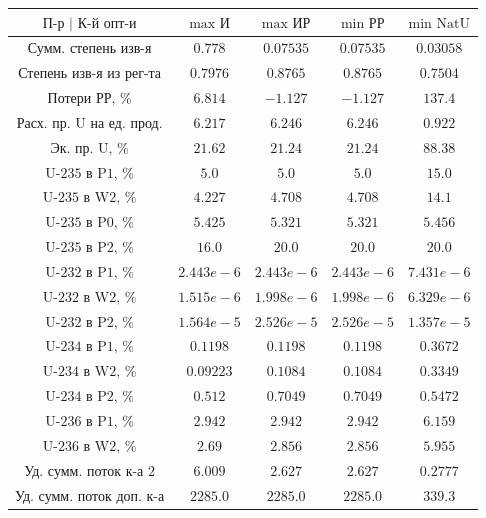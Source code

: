 \begin{table}
    \begin{tabular}{ccccc}
        $\text{П-р | К-й опт-и}$ & $\text{max И}$ & $\text{max ИР}$ & $\text{min РР}$ & $\text{min NatU}$\\ \hline
        $\text{Сумм. степень изв-я}$ & $0.778$ & $0.07535$ & $0.07535$ & $0.03058$\\ \hline
        $\text{Степень изв-я из рег-та}$ & $0.7976$ & $0.8765$ & $0.8765$ & $0.7504$\\ \hline
        $\text{Потери РР, \%}$ & $6.814$ & $-1.127$ & $-1.127$ & $137.4$\\ \hline
        $\text{Расх. пр. U на ед. прод.}$ & $6.217$ & $6.246$ & $6.246$ & $0.922$\\ \hline
        $\text{Эк. пр. U, \%}$ & $21.62$ & $21.24$ & $21.24$ & $88.38$\\ \hline
        $\text{U-235 в P1, \%}$ & $5.0$ & $5.0$ & $5.0$ & $15.0$\\ \hline
        $\text{U-235 в W2, \%}$ & $4.227$ & $4.708$ & $4.708$ & $14.1$\\ \hline
        $\text{U-235 в P0, \%}$ & $5.425$ & $5.321$ & $5.321$ & $5.456$\\ \hline
        $\text{U-235 в P2, \%}$ & $16.0$ & $20.0$ & $20.0$ & $20.0$\\ \hline
        $\text{U-232 в P1, \%}$ & $2.443e-6$ & $2.443e-6$ & $2.443e-6$ & $7.431e-6$\\ \hline
        $\text{U-232 в W2, \%}$ & $1.515e-6$ & $1.998e-6$ & $1.998e-6$ & $6.329e-6$\\ \hline
        $\text{U-232 в P2, \%}$ & $1.564e-5$ & $2.526e-5$ & $2.526e-5$ & $1.357e-5$\\ \hline
        $\text{U-234 в P1, \%}$ & $0.1198$ & $0.1198$ & $0.1198$ & $0.3672$\\ \hline
        $\text{U-234 в W2, \%}$ & $0.09223$ & $0.1084$ & $0.1084$ & $0.3349$\\ \hline
        $\text{U-234 в P2, \%}$ & $0.512$ & $0.7049$ & $0.7049$ & $0.5472$\\ \hline
        $\text{U-236 в P1, \%}$ & $2.942$ & $2.942$ & $2.942$ & $6.159$\\ \hline
        $\text{U-236 в W2, \%}$ & $2.69$ & $2.856$ & $2.856$ & $5.955$\\ \hline
        $\text{Уд. сумм. поток к-а 2}$ & $6.009$ & $2.627$ & $2.627$ & $0.2777$\\ \hline
        $\text{Уд. сумм. поток доп. к-а}$ & $2285.0$ & $2285.0$ & $2285.0$ & $339.3$\\ \hline

\end{tabular}
\end{table}
